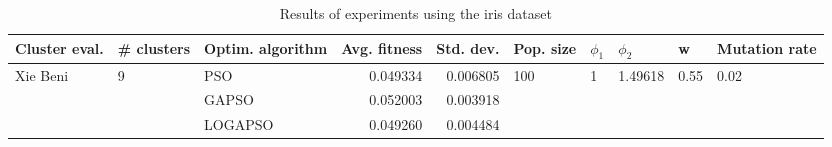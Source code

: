 \begin{table}
\centering
\caption{Results of experiments using the iris dataset}
\begin{tabular}{lllrrlllll}
\toprule
            Cluster eval. &        \# clusters & Optim. algorithm &  Avg. fitness &  Std. dev. &            Pop. size &         $\phi_{1}$ &               $\phi_{2}$ &                     w &         Mutation rate \\
\midrule
\multirow{3}{*}{Xie Beni} & \multirow{3}{*}{9} &              PSO &      0.049334 &   0.006805 & \multirow{3}{*}{100} & \multirow{3}{*}{1} & \multirow{3}{*}{1.49618} & \multirow{3}{*}{0.55} & \multirow{3}{*}{0.02} \\
                          &                    &            GAPSO &      0.052003 &   0.003918 &                      &                    &                          &                       &                       \\
                          &                    &          LOGAPSO &      0.049260 &   0.004484 &                      &                    &                          &                       &                       \\
\bottomrule
\end{tabular}
\end{table}
